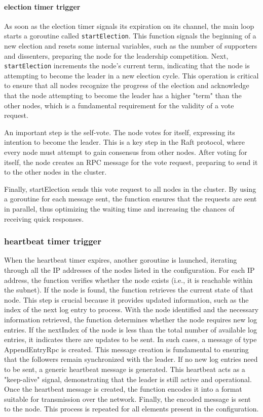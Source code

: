 \paragraph{election timer trigger}
As soon as the election timer signals its expiration on its channel, the main loop 
starts a goroutine called \texttt{startElection}. This function signals the beginning of a 
new election and resets some internal variables, such as the number of supporters 
and dissenters, preparing the node for the leadership competition.
Next, \texttt{startElection} increments the node's current term, indicating that the node 
is attempting to become the leader in a new election cycle. This operation is critical 
to ensure that all nodes recognize the progress of the election and acknowledge that 
the node attempting to become the leader has a higher "term" than the other nodes, 
which is a fundamental requirement for the validity of a vote request.

An important step is the self-vote. The node votes for itself, expressing its intention 
to become the leader. This is a key step in the Raft protocol, where every node 
must attempt to gain consensus from other nodes.
After voting for itself, the node creates an RPC message for the vote request, 
preparing to send it to the other nodes in the cluster.

Finally, startElection sends this vote request to all nodes in the cluster. By using 
a goroutine for each message sent, the function ensures that the requests are sent in 
parallel, thus optimizing the waiting time and increasing the chances of receiving quick responses.

\subsubsection{heartbeat timer trigger}
When the heartbeat timer expires, another goroutine is launched, iterating through 
all the IP addresses of the nodes listed in the configuration. For each IP address, 
the function verifies whether the node exists (i.e., it is reachable within the 
subnet). If the node is found, the function retrieves the current state of that node.
This step is crucial because it provides updated information, such as the index of the 
next log entry to process. With the node identified and the necessary information 
retrieved, the function determines whether the node requires new log entries. If the 
nextIndex of the node is less than the total number of available log entries, it 
indicates there are updates to be sent.
In such cases, a message of type AppendEntryRpc is created. This message creation is 
fundamental to ensuring that the followers remain synchronized with the leader. If no 
new log entries need to be sent, a generic heartbeat message is generated. This 
heartbeat acts as a "keep-alive" signal, demonstrating that the leader is still active and operational.
Once the heartbeat message is created, the function encodes it into a format suitable 
for transmission over the network. Finally, the encoded message is sent to the node. 
This process is repeated for all elements present in the configuration.

